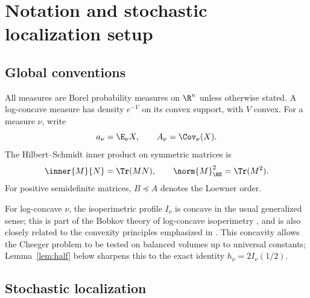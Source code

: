 \documentclass[../../main.tex]{subfiles}
\begin{document}
\section{Notation and stochastic localization setup}
\label{sec:notation}

\subsection{Global conventions}

All measures are Borel probability measures on $\R^n$ unless otherwise stated. A log-concave
measure has density $e^{-V}$ on its convex support, with $V$ convex. For a measure $\nu$, write
\[
  a_\nu=\E_\nu X,
  \qquad A_\nu=\Cov_\nu(X).
\]
The Hilbert--Schmidt inner product on symmetric matrices is
\[
  \inner{M}{N}=\Tr(MN),\qquad \norm{M}_{\HS}^2=\Tr(M^2).
\]
For positive semidefinite matrices, $B\preceq A$ denotes the Loewner order.

For log-concave $\nu$, the isoperimetric profile $I_\nu$ is concave in the usual generalized sense;
this is part of the Bobkov theory of log-concave isoperimetry \cite{Bobkov1999LogConcave}, and is also
closely related to the convexity principles emphasized in \cite{Milman2009Isoperimetric}. This
concavity allows the Cheeger problem to be tested on balanced volumes up to universal constants;
Lemma~\ref{lem:half} below sharpens this to the exact identity $h_\nu=2I_\nu(1/2)$.

\subsection{Stochastic localization}
\end{document}
